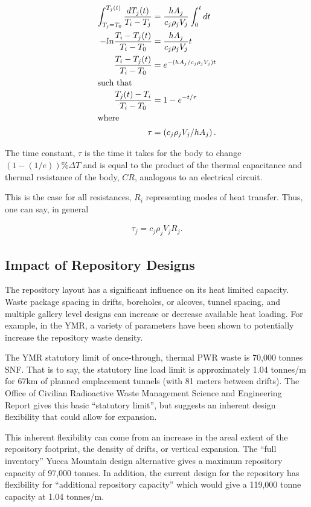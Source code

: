 \begin{align}
  \int_{T_j=T_0}^{T_j(t)} 
  \frac{dT_j(t)}{T_i-T_j}&=\frac{hA_j}{c_j\rho_jV_j}\int_0^t dt\\
  -ln\frac{T_i-T_j(t)}{T_i-T_0}&=\frac{hA_j}{c_j\rho_jV_j}t\\
  \frac{T_i-T_j(t)}{T_i-T_0}&= e^{-(hA_j/c_j\rho_jV_j)t}\\
  \intertext{such that}
  \frac{T_j(t)-T_i}{T_i-T_0}&= 1- e^{-t/\tau}\\
  \intertext{where}
  \tau &= \left( c_j\rho_jV_j/hA_j \right).
\end{align}

The time constant, $\tau$ is the time it takes for the body to change 
$(1-(1/e))\%\Delta T$ and is equal to the product of the thermal capacitance and 
thermal resistance of the body, $CR$, analogous to an electrical circuit.

\cite{el-wakil_nuclear_1981} This is the case for all resistances, $R_i$ 
representing modes of heat transfer. Thus, one can say, in general

\begin{align}
  \tau_j = c_j \rho_j V_j R_j.
\end{align}

\subsection{Impact of Repository Designs}

The repository layout has a significant influence on its heat limited capacity. 
Waste package spacing in drifts, boreholes, or alcoves, tunnel spacing, and
multiple gallery level designs can increase or decrease available heat loading. 
For example, in the \gls{YMR}, a variety of parameters have been shown to 
potentially increase the repository waste density. 

The \gls{YMR} statutory limit of once-through, thermal PWR waste is 70,000 tonnes 
SNF.  That is to say, the statutory line load limit is approximately 1.04 tonnes/m
for 67km of planned emplacement tunnels (with 81 meters between drifts). The
Office of Civilian Radioactive Waste Management Science and Engineering Report
gives this basic ``statutory limit'', but suggests an inherent design
flexibility that could allow for expansion. 

This inherent flexibility can come from an increase in the areal extent of the 
repository footprint, the density of drifts, or vertical expansion. The  ``full inventory'' Yucca
Mountain design alternative gives a maximum repository capacity of 97,000
tonnes. In addition, the current design for the repository has flexibility for
``additional repository capacity'' which would give a 119,000 tonne capacity at
1.04 tonnes/m.\cite{doe_yucca_2002}

